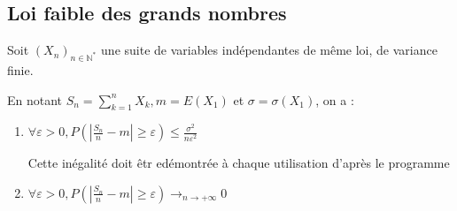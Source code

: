 \documentclass[a4paper,12pt]{book}
\newcommand{\Thr}[2]{\begin{tcolorbox}[sharp corners, colback=white,colframe=red!90!black!75, title=Théorème : #1]#2\end{tcolorbox}}
\def\N{\mathbb{N}}
\begin{document}
\subsection{Loi faible des grands nombres}
\Thr{Loi faible des grands nombres}{Soit $(X_n)_{n\in\N^*}$ une suite de variables indépendantes de même loi, de variance finie.
\par En notant $S_n=\sum\limits_{k=1}^nX_k, m=E(X_1)$ et $\sigma =\sigma(X_1)$, on a :\begin{enumerate}
\item \begin{center}$\forall \varepsilon>0, P\left(\left\vert\frac{S_n}{n}-m\right\vert\geq\varepsilon\right)\leq\frac{\sigma^2}{n\varepsilon^2}$\end{center} \par Cette inégalité doit êtr edémontrée à chaque utilisation d'après le programme
\item \begin{center}$\forall \varepsilon>0, P\left(\left\vert\frac{S_n}{n}-m\right\vert\geq\varepsilon\right)\to_{n\to+\infty} 0$\end{center}
\end{enumerate}}
\end{document}
